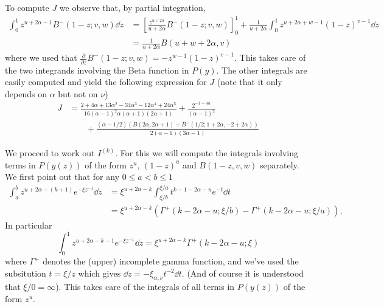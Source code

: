 To compute $J$ we observe that, by partial integration, 
\begin{align*}
	\int_0^1 z^{u+2\alpha-1} B^-(1-z;v,w) \dd z 
	&= \left[ \frac{z^{u+2\alpha}}{u+2\alpha} B^-(1-z;v,w) \right]_0^1 
		+ \frac{1}{u+2\alpha} \int_0^1 z^{u+2\alpha+w-1} (1-z)^{v-1} \dd z \\
	&= \frac{1}{u+2\alpha} B(u+w+2\alpha,v)
\end{align*}
where we used that $\frac{\partial}{\partial z} B^-(1-z;v,w) = - z^{w-1} (1-z)^{v-1}$. This takes care of the two integrands involving the Beta function in $P(y)$. The other integrals are easily computed and yield the following expression for $J$ (note that it only depends on $\alpha$ but not on $\nu$)
\begin{align*}
J&=\frac{2 + 4 \alpha + 13 \alpha^2 - 34 \alpha^3 - 12\alpha^4 + 
	24 \alpha^5}{16(\alpha-1)^2 \alpha (\alpha+1) (2\alpha+1)} +  \frac{2^{-1 - 
		4 \alpha}}{(\alpha - 1)^2} \\
	&\qquad+ \frac{(\alpha - 1/2) (B(2 \alpha, 2 \alpha + 1) + 
	B^-(1/2; 1 + 2 \alpha, -2 + 2 \alpha))}{2 (\alpha - 1) (3 \alpha - 1)}
\end{align*}

We proceed to work out $I^{(k)}$. For this we will compute the integrals involving terms in $P(y(z))$ of the form $z^u$, $(1-z)^u$ and $B(1-z,v,w)$ separately. We first point out that for any $0 \le a < b \le 1$
\begin{align*}
	\int_a^b z^{u+2\alpha-(k+1)} e^{-\xi z^{-1}} \dd z
	&= \xi^{u+2\alpha-k} \int_{\xi/b}^{\xi/a} t^{k-1-2\alpha-u} e^{-t} \dd t \\
	&= \xi^{u+2\alpha-k} \left( \Gamma^+( k-2\alpha-u;\xi/b) - \Gamma^+( k-2\alpha-u; \xi/a) \right), 
\end{align*}
In particular
\begin{equation}\label{eq:integral_Delta_P_z}
	\int_0^1 z^{u+2\alpha-k-1} e^{-\xi z^{-1}} \dd z = \xi^{u+2\alpha-k} \Gamma^+(k-2\alpha-u;\xi)
\end{equation}
where $\Gamma^+$ denotes the (upper) incomplete gamma function, and we've used the subsitution
$t = \xi / z$ which gives $\dd z = -\xi_{\alpha, \nu} t^{-2} \dd t$. (And of course it is understood that 
$\xi/0 = \infty$). This takes care of the integrals of all terms in $P(y(z))$ of the form $z^{u}$. 


